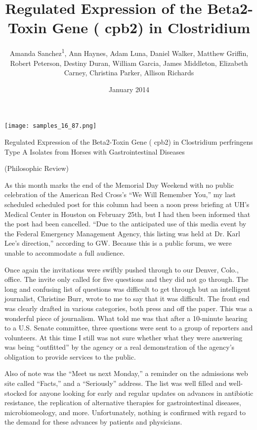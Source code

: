 \documentclass{article}
\title{Regulated Expression of the Beta2-Toxin Gene ( cpb2) in Clostridium}
\author{Amanda Sanchez\textsuperscript{1},  Ann Haynes,  Adam Luna,  Daniel Walker,  Matthew Griffin,  Robert Peterson,  Destiny Duran,  William Garcia,  James Middleton,  Elizabeth Carney,  Christina Parker,  Allison Richards}
\affil{\textsuperscript{1}Memorial Sloan Kettering Cancer Center}
\date{January 2014}
\begin{document}
\maketitle

\begin{center}
\begin{minipage}{0.75\linewidth}
\texttt{[image: samples\_16\_87.png]}
\end{minipage}
\end{center}

Regulated Expression of the Beta2-Toxin Gene ( cpb2) in Clostridium perfringens Type A Isolates from Horses with Gastrointestinal Diseases

(Philosophic Review)

As this month marks the end of the Memorial Day Weekend with no public celebration of the American Red Cross’s “We Will Remember You,” my last scheduled scheduled post for this column had been a noon press briefing at UH’s Medical Center in Houston on February 25th, but I had then been informed that the post had been cancelled. “Due to the anticipated use of this media event by the Federal Emergency Management Agency, this listing was held at Dr. Karl Lee’s direction,” according to GW. Because this is a public forum, we were unable to accommodate a full audience.

Once again the invitations were swiftly pushed through to our Denver, Colo., office. The invite only called for five questions and they did not go through. The long and confusing list of questions was difficult to get through but an intelligent journalist, Christine Burr, wrote to me to say that it was difficult. The front end was clearly drafted in various categories, both press and off the paper. This was a wonderful piece of journalism. What told me was that after a 10-minute hearing to a U.S. Senate committee, three questions were sent to a group of reporters and volunteers. At this time I still was not sure whether what they were answering was being “outfitted” by the agency or a real demonstration of the agency’s obligation to provide services to the public.

Also of note was the “Meet us next Monday,” a reminder on the admissions web site called “Facts,” and a “Seriously” address. The list was well filled and well-stocked for anyone looking for early and regular updates on advances in antibiotic resistance, the replication of alternative therapies for gastrointestinal diseases, microbiomeology, and more. Unfortunately, nothing is confirmed with regard to the demand for these advances by patients and physicians.
\end{document}
